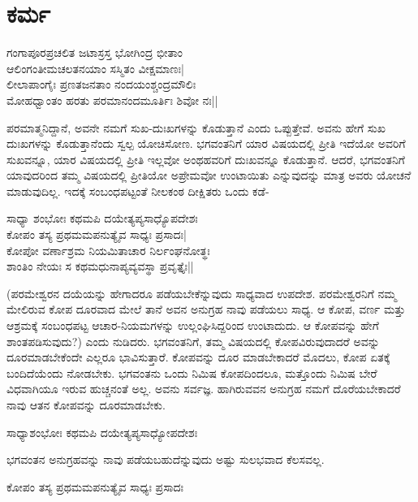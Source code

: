 \newpage

\section{ಕರ್ಮ}

\begin{shloka}
ಗಂಗಾಪೂರಪ್ರಚಲಿತ ಜಟಾಸ್ರಸ್ತ ಭೋಗಿಂದ್ರ ಭೀತಾಂ\\
ಆಲಿಂಗಂತೀಮಚಲತನಯಾಂ ಸಸ್ಮಿತಂ ವೀಕ್ಷಮಾಣಃ|\\
ಲೀಲಾಪಾಂಗೈಃ ಪ್ರಣತಜನತಾಂ ನಂದಯಂಶ್ಚಂದ್ರಮೌಲಿಃ\\
ಮೋಹಧ್ವಾಂತಂ ಹರತು ಪರಮಾನಂದಮೂರ್ತಿಃ ಶಿವೋ ನಃ||
\end{shloka}

ಪರಮಾತ್ಮನಿದ್ದಾನೆ, ಅವನೇ ನಮಗೆ ಸುಖ-ದುಃಖಗಳನ್ನು ಕೊಡುತ್ತಾನೆ ಎಂದು ಒಪ್ಪುತ್ತೇವೆ. ಅವನು ಹೇಗೆ ಸುಖ ದುಃಖಗಳನ್ನು ಕೊಡುತ್ತಾನೆಂದು ಸ್ವಲ್ಪ ಯೋಚಿಸೋಣ. ಭಗವಂತನಿಗೆ ಯಾರ ವಿಷಯದಲ್ಲಿ ಪ್ರೀತಿ ಇದೆಯೋ ಅವರಿಗೆ ಸುಖವನ್ನೂ, ಯಾರ ವಿಷಯದಲ್ಲಿ ಪ್ರೀತಿ ಇಲ್ಲವೋ ಅಂಥಹವರಿಗೆ ದುಃಖವನ್ನೂ ಕೊಡುತ್ತಾನೆ. ಆದರೆ, ಭಗವಂತನಿಗೆ ಯಾವುದರಿಂದ ತಮ್ಮ ವಿಷಯದಲ್ಲಿ ಪ್ರೀತಿಯೋ ಅಪ್ರೇಮವೋ ಉಂಟಾಯಿತು ಎನ್ನುವುದನ್ನು ಮಾತ್ರ ಅವರು ಯೋಚನೆ ಮಾಡುವುದಿಲ್ಲ. ಇದಕ್ಕೆ ಸಂಬಂಧಪಟ್ಟಂತೆ ನೀಲಕಂಠ ದೀಕ್ಷಿತರು ಒಂದು ಕಡೆ-

\begin{shloka}
ಸಾಧ್ಯಾ ಶಂಭೋಃ ಕಥಮಪಿ ದಯೇತ್ಯಪ್ಯಸಾಧ್ಯೊಪದೇಶಃ\\
ಕೋಪಂ ತಸ್ಯ ಪ್ರಥಮಮಪನುತ್ಯೈವ ಸಾಧ್ಯಃ ಪ್ರಸಾದಃ|\\
ಕೋಪೋ ವರ್ಣಾಶ್ರಮ ನಿಯಮಿತಾಚಾರ ನಿರ್ಲಂಘನೋತ್ಥಃ\\
ಶಾಂತಿಂ ನೇಯಃ ಸ ಕಥಮಧುನಾಪ್ಯವ್ಯವಸ್ಥಾ ಪ್ರವೃತ್ತೈಃ||
\end{shloka}

(ಪರಮೇಶ್ವರನ ದಯೆಯನ್ನು ಹೇಗಾದರೂ ಪಡೆಯಬೇಕೆನ್ನುವುದು ಸಾಧ್ಯವಾದ ಉಪದೇಶ. ಪರಮೇಶ್ವರನಿಗೆ ನಮ್ಮ ಮೇಲಿರುವ ಕೋಪ ದೂರವಾದ ಮೇಲೆ ತಾನೆ ಅವನ ಅನುಗ್ರಹ ನಾವು ಪಡೆಯಲು ಸಾಧ್ಯ. ಆ ಕೋಪ, ವರ್ಣ ಮತ್ತು ಆಶ್ರಮಕ್ಕೆ ಸಂಬಂಧಪಟ್ಟ ಆಚಾರ-ನಿಯಮಗಳನ್ನು ಉಲ್ಲಂಘಿಸಿದ್ದರಿಂದ ಉಂಟಾದುದು. ಆ ಕೋಪವನ್ನು ಹೇಗೆ ಶಾಂತಪಡಿಸುವುದು?) ಎಂದು ನುಡಿದರು. ಭಗವಂತನಿಗೆ, ತಮ್ಮ ವಿಷಯದಲ್ಲಿ ಕೋಪವಿರುವುದಾದರೆ ಅವನ್ನು ದೂರಮಾಡಬೇಕೆಂದೇ ಎಲ್ಲರೂ ಭಾವಿಸುತ್ತಾರೆ. ಕೋಪವನ್ನು ದೂರ ಮಾಡಬೇಕಾದರೆ ಮೊದಲು, ಕೋಪ ಏತಕ್ಕೆ ಬಂದಿದೆಯೆಂದು ನೋಡಬೇಕು. ಭಗವಂತನು ಒಂದು ನಿಮಿಷ ಕೋಪದಿಂದಲೂ, ಮತ್ತೊಂದು ನಿಮಿಷ ಬೇರೆ ವಿಧವಾಗಿಯೂ ಇರುವ ಹುಚ್ಚನಂತೆ ಅಲ್ಲ. ಅವನು ಸರ್ವಜ್ಞ. ಹಾಗಿರುವವನ ಅನುಗ್ರಹ ನಮಗೆ ದೊರೆಯಬೇಕಾದರೆ ನಾವು ಆತನ ಕೋಪವನ್ನು ದೂರಮಾಡಬೇಕು.

\begin{shloka}
ಸಾಧ್ಯಾಶಂಭೋಃ ಕಥಮಪಿ ದಯೇತ್ಯಪ್ಯಸಾಧ್ಯೋಪದೇಶಃ
\end{shloka}

ಭಗವಂತನ ಅನುಗ್ರಹವನ್ನು ನಾವು ಪಡೆಯಬಹುದೆನ್ನುವುದು ಅಷ್ಟು ಸುಲಭವಾದ ಕೆಲಸವಲ್ಲ.

\begin{shloka}
ಕೋಪಂ ತಸ್ಯ ಪ್ರಥಮಮಪನುತ್ಯೈವ ಸಾಧ್ಯಃ ಪ್ರಸಾದಃ
\end{shloka}

